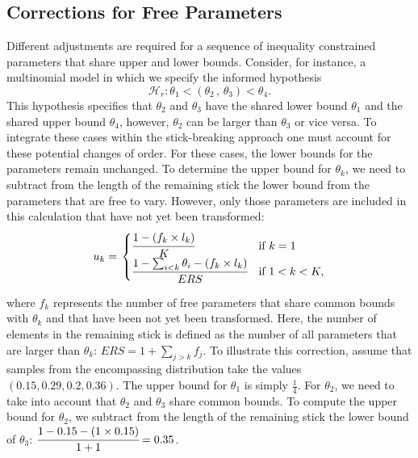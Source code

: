 \documentclass[
  english,
  man,floatsintext]{apa6}
\begin{document}
\hypertarget{corrections-for-free-parameters}{%
\subsection{Corrections for Free Parameters}\label{corrections-for-free-parameters}}

Different adjustments are required for a sequence of inequality
constrained parameters that share upper and lower bounds. Consider, for
instance, a multinomial model in which we specify the informed
hypothesis
\[\mathcal{H}_r: \theta_1 < ( \theta_2 \, , \, \theta_3) < \theta_4.\] This
hypothesis specifies that \(\theta_2\) and \(\theta_3\) have the shared
lower bound \(\theta_1\) and the shared upper bound \(\theta_4\),
however, \(\theta_2\) can be larger than \(\theta_3\) or vice versa. To
integrate these cases within the stick-breaking approach one must
account for these potential changes of order. For these cases, the lower
bounds for the parameters remain unchanged. To determine the upper bound
for \(\theta_k\), we need to subtract from the length of the remaining
stick the lower bound from the parameters that are free to vary.
However, only those parameters are included in this calculation that
have not yet been transformed:
\begin{align}
  u_k = \left.
  \begin{cases}
      \cfrac{1 - (f_k \times l_k)}{K} & \text{if } k = 1 \\
      \cfrac{1 - \sum_{i < k} \theta_i - (f_k \times l_k)}{ERS} & \text{if } 1 < k < K,
  \end{cases}
    \right.
\end{align}

\noindent where \(f_k\) represents the number of free parameters that share common
bounds with \(\theta_k\) and that have been not yet been transformed.
Here, the number of elements in the remaining stick is defined as the
number of all parameters that are larger than \(\theta_k\):
\(ERS = 1 + \sum_{j > k} f_j\). To illustrate this correction, assume
that samples from the encompassing distribution take the values
\((0.15, 0.29, 0.2, 0.36)\). The upper bound for \(\theta_1\) is simply
\(\frac{1}{4}\). For \(\theta_2\), we need to take into account that
\(\theta_2\) and \(\theta_3\) share common bounds. To compute the upper
bound for \(\theta_2\), we subtract from the length of the remaining
stick the lower bound of \(\theta_3\):
\(\cfrac{1 - 0.15 - (1 \times 0.15)}{1 + 1} = 0.35\).
\end{document}
